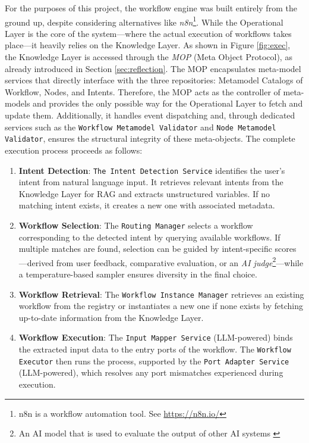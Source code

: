 For the purposes of this project, the workflow engine was built entirely from the ground up, despite considering alternatives like \textit{n8n}\footnote{
n8n is a workflow automation tool. See \url{https://n8n.io/}}.
While the Operational Layer is the core of the system—where the actual execution of workflows takes place—it heavily relies on the Knowledge Layer. As shown in Figure \ref{fig:exec}, the Knowledge Layer is accessed through the \textit{MOP} (Meta Object Protocol), as already introduced in Section \ref{sec:reflection}. The MOP encapsulates meta-model services that directly interface with the three repositories: Metamodel Catalogs of Workflow, Nodes, and Intents. Therefore, the MOP acts as the controller of meta-models and provides the only possible way for the Operational Layer to fetch and update them. Additionally, it handles event dispatching and, through dedicated services such as the \texttt{Workflow Metamodel Validator} and \texttt{Node Metamodel Validator}, ensures the structural integrity of these meta-objects. The complete execution process proceeds as follows:

\begin{enumerate}[leftmargin=*, label=\textbf{\arabic*.}]
    \item\textbf{Intent Detection}: \texttt{The Intent Detection Service} identifies the user's intent from natural language input. It retrieves relevant intents from the Knowledge Layer for RAG and extracts unstructured variables. If no matching intent exists, it creates a new one with associated metadata.
    \item\textbf{Workflow Selection}:  The \texttt{Routing Manager} selects a workflow corresponding to the detected intent by querying available workflows. If multiple matches are found, selection can be guided by intent-specific scores—derived from user feedback, comparative evaluation, or an \textit{AI judge}\footnote{An AI model that is used to evaluate the output of other AI systems \cite{huyen2024ai}}—while a temperature-based sampler ensures diversity in the final choice.
    \item\textbf{Workflow Retrieval}: The \texttt{Workflow Instance Manager} retrieves an existing workflow from the registry or instantiates a new one if none exists by fetching up-to-date information from the Knowledge Layer.
    \item\textbf{Workflow Execution}: The \texttt{Input Mapper Service} (LLM-powered) binds the extracted input data to the entry ports of the workflow. The \texttt{Workflow Executor} then runs the process, supported by the \texttt{Port Adapter Service} (LLM-powered), which resolves any port mismatches experienced during execution.
\end{enumerate}


